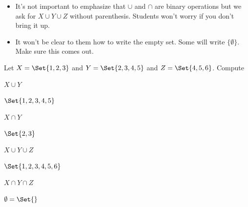\documentclass{workbook}
\newcommand{\displayonlynewpage}{\begin{displayonly}\newpage\end{displayonly}}
\begin{document}
\begin{slide}
	\displayonlynewpage
	\begin{bookonly}\end{bookonly}

	\question
	\begin{annotation}
		\begin{goals}
		\end{goals}

		\begin{notes}
			\begin{itemize}
				\item It's not important to emphasize that $\cup$ and $\cap$ are binary
			operations but we ask for $X\cup Y\cup Z$ without parenthesis.
			Students won't worry if you don't bring it up.
				\item It won't be clear to them how to write the empty set.
					Some will write $\{\emptyset\}$. Make sure this comes out.
			\end{itemize}
		\end{notes}
	\end{annotation}
	Let $X=\Set{1,2,3}$ and $Y=\Set{2,3,4,5}$ and $Z=\Set{4,5,6}$.  Compute
	\begin{parts}
		\item $X\cup Y$ \begin{solution}[inline]$\Set{1,2,3,4,5}$\end{solution}
		\item $X\cap Y$ \begin{solution}[inline]$\Set{2,3}$\end{solution}
		\item $X\cup Y\cup Z$ \begin{solution}[inline]$\Set{1,2,3,4,5,6}$\end{solution}
		\item $X\cap Y\cap Z$ \begin{solution}[inline]$\emptyset=\Set{}$\end{solution}
	\end{parts}
	\begin{bookonly}\end{bookonly}
\end{slide}

\end{document}
